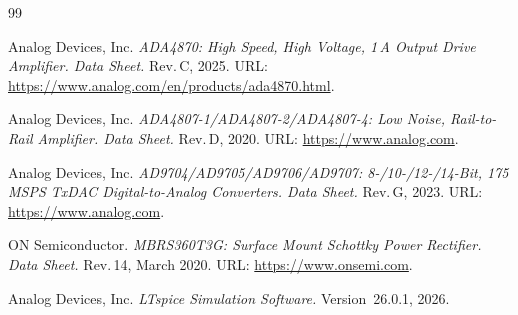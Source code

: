 \documentclass[a4paper, 12pt]{article}
\begin{document}
\begin{thebibliography}{99}

Analog Devices, Inc. \textit{ADA4870: High Speed, High Voltage,
1\,A Output Drive Amplifier. Data Sheet.} Rev.\,C, 2025.
URL: \url{https://www.analog.com/en/products/ada4870.html}.

Analog Devices, Inc. \textit{ADA4807-1/ADA4807-2/ADA4807-4:
Low Noise, Rail-to-Rail Amplifier. Data Sheet.} Rev.\,D, 2020.
URL: \url{https://www.analog.com}.

Analog Devices, Inc. \textit{AD9704/AD9705/AD9706/AD9707:
8-/10-/12-/14-Bit, 175\,MSPS TxDAC Digital-to-Analog Converters.
Data Sheet.} Rev.\,G, 2023.
URL: \url{https://www.analog.com}.

ON Semiconductor. \textit{MBRS360T3G: Surface Mount Schottky Power
Rectifier. Data Sheet.} Rev.\,14, March 2020.
URL: \url{https://www.onsemi.com}.

Analog Devices, Inc. \textit{LTspice Simulation Software.}
Version~26.0.1, 2026.

\end{thebibliography}
\end{document}
